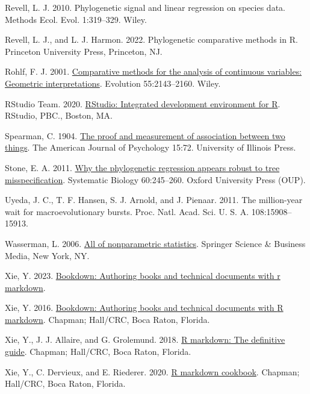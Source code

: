 \documentclass[fleqn,10pt,lineno]{wlpeerj} %
\newlength{\cslhangindent}
\newenvironment{CSLReferences}[2] %
 {\begin{list}{}{%
  \setlength{\itemindent}{0pt}
  \setlength{\leftmargin}{0pt}
  \setlength{\parsep}{0pt}
  \ifodd #1
   \setlength{\leftmargin}{\cslhangindent}
   \setlength{\itemindent}{-1\cslhangindent}
  \fi
  \setlength{\itemsep}{#2\baselineskip}}}
 {\end{list}}
\begin{document}
\begin{CSLReferences}{1}{0}
Revell, L. J. 2010. Phylogenetic signal and linear regression on species data. Methods Ecol. Evol. 1:319--329. Wiley.

Revell, L. J., and L. J. Harmon. 2022. Phylogenetic comparative methods in {R}. Princeton University Press, Princeton, NJ.

Rohlf, F. J. 2001. \href{https://doi.org/10.1111/j.0014-3820.2001.tb00731.x}{Comparative methods for the analysis of continuous variables: Geometric interpretations}. Evolution 55:2143--2160. Wiley.

RStudio Team. 2020. \href{http://www.rstudio.com/}{R{S}tudio: Integrated development environment for {R}}. RStudio, PBC., Boston, MA.

Spearman, C. 1904. \href{https://doi.org/10.2307/1412159}{The proof and measurement of association between two things}. The American Journal of Psychology 15:72. University of Illinois Press.

Stone, E. A. 2011. \href{https://doi.org/10.1093/sysbio/syq098}{Why the phylogenetic regression appears robust to tree misspecification}. Systematic Biology 60:245--260. Oxford University Press (OUP).

Uyeda, J. C., T. F. Hansen, S. J. Arnold, and J. Pienaar. 2011. The million-year wait for macroevolutionary bursts. Proc. Natl. Acad. Sci. U. S. A. 108:15908--15913.

Wasserman, L. 2006. \href{https://doi.org/10.1007/0-387-30623-4}{All of nonparametric statistics}. Springer Science \& Business Media, New York, NY.

Xie, Y. 2023. \href{https://github.com/rstudio/bookdown}{Bookdown: Authoring books and technical documents with r markdown}.

Xie, Y. 2016. \href{https://bookdown.org/yihui/bookdown}{Bookdown: Authoring books and technical documents with {R} markdown}. Chapman; Hall/CRC, Boca Raton, Florida.

Xie, Y., J. J. Allaire, and G. Grolemund. 2018. \href{https://bookdown.org/yihui/rmarkdown}{R markdown: The definitive guide}. Chapman; Hall/CRC, Boca Raton, Florida.

Xie, Y., C. Dervieux, and E. Riederer. 2020. \href{https://bookdown.org/yihui/rmarkdown-cookbook}{R markdown cookbook}. Chapman; Hall/CRC, Boca Raton, Florida.

\end{CSLReferences}
\end{document}

